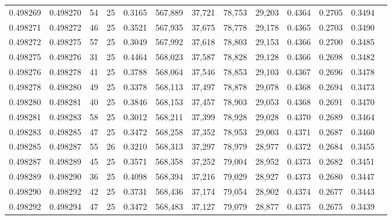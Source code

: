 \begin{tabular}{rrrrrrrrrrrrr}
0.498269 & 0.498270 &    54 &  25 &                                     0.3165 & 567,889 &  37,721 &  78,753 &  29,203 & 0.4364 & 0.2705 & 0.3494 \\
0.498271 & 0.498272 &    46 &  25 &                                     0.3521 & 567,935 &  37,675 &  78,778 &  29,178 & 0.4365 & 0.2703 & 0.3490 \\
0.498272 & 0.498275 &    57 &  25 &                                     0.3049 & 567,992 &  37,618 &  78,803 &  29,153 & 0.4366 & 0.2700 & 0.3485 \\
0.498275 & 0.498276 &    31 &  25 &                                     0.4464 & 568,023 &  37,587 &  78,828 &  29,128 & 0.4366 & 0.2698 & 0.3482 \\
0.498276 & 0.498278 &    41 &  25 &                                     0.3788 & 568,064 &  37,546 &  78,853 &  29,103 & 0.4367 & 0.2696 & 0.3478 \\
0.498278 & 0.498280 &    49 &  25 &                                     0.3378 & 568,113 &  37,497 &  78,878 &  29,078 & 0.4368 & 0.2694 & 0.3473 \\
0.498280 & 0.498281 &    40 &  25 &                                     0.3846 & 568,153 &  37,457 &  78,903 &  29,053 & 0.4368 & 0.2691 & 0.3470 \\
0.498281 & 0.498283 &    58 &  25 &                                     0.3012 & 568,211 &  37,399 &  78,928 &  29,028 & 0.4370 & 0.2689 & 0.3464 \\
0.498283 & 0.498285 &    47 &  25 &                                     0.3472 & 568,258 &  37,352 &  78,953 &  29,003 & 0.4371 & 0.2687 & 0.3460 \\
0.498285 & 0.498287 &    55 &  26 &                                     0.3210 & 568,313 &  37,297 &  78,979 &  28,977 & 0.4372 & 0.2684 & 0.3455 \\
0.498287 & 0.498289 &    45 &  25 &                                     0.3571 & 568,358 &  37,252 &  79,004 &  28,952 & 0.4373 & 0.2682 & 0.3451 \\
0.498289 & 0.498290 &    36 &  25 &                                     0.4098 & 568,394 &  37,216 &  79,029 &  28,927 & 0.4373 & 0.2680 & 0.3447 \\
0.498290 & 0.498292 &    42 &  25 &                                     0.3731 & 568,436 &  37,174 &  79,054 &  28,902 & 0.4374 & 0.2677 & 0.3443 \\
0.498292 & 0.498294 &    47 &  25 &                                     0.3472 & 568,483 &  37,127 &  79,079 &  28,877 & 0.4375 & 0.2675 & 0.3439 \\

\end{tabular}
